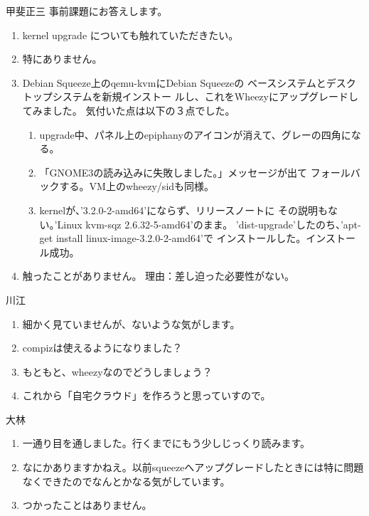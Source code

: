 \documentclass[mingoth,a4paper]{jsarticle}
\begin{document}
\clearpage

\begin{prework}{ 甲斐正三 }
  事前課題にお答えします。
  \begin{enumerate}
  \item %
    kernel upgrade についても触れていただきたい。
  \item %
    特にありません。
  \item %
    Debian Squeeze上のqemu-kvmにDebian Squeezeの
    ベースシステムとデスクトップシステムを新規インストー
    ルし、これをWheezyにアップグレードしてみました。
    気付いた点は以下の３点でした。
    \def\theenumii{\arabic{enumii}}
    \def\labelenumii{(\theenumii)~}
    \begin{enumerate}
    \item %
      upgrade中、パネル上のepiphanyのアイコンが消えて、グレーの四角になる。
    \item %
      「GNOME3の読み込みに失敗しました。」メッセージが出て
      フォールバックする。VM上のwheezy/sidも同様。
    \item %
      kernelが、'3.2.0-2-amd64'にならず、リリースノートに
      その説明もない。'Linux kvm-sqz 2.6.32-5-amd64'のまま。
      'dist-upgrade'したのち、'apt-get install linux-image-3.2.0-2-amd64'で
      インストールした。インストール成功。
    \end{enumerate}
  \item %
    触ったことがありません。
    理由：差し迫った必要性がない。
  \end{enumerate}
\end{prework}

\begin{prework}{ 川江 }
  \begin{enumerate}
  \item %
   細かく見ていませんが、ないような気がします。
 \item %
   compizは使えるようになりました？
 \item %
   もともと、wheezyなのでどうしましょう？
 \item %
   これから「自宅クラウド」を作ろうと思っていすので。
 \end{enumerate}
\end{prework}

\begin{prework}{ 大林 }
  \begin{enumerate}
  \item %
   一通り目を通しました。行くまでにもう少しじっくり読みます。
   \setcounter{enumi}{2}
 \item %
   なにかありますかねえ。以前squeezeへアップグレードしたときには特に問題なくできたのでなんとかなる気がしています。
 \item %
   つかったことはありません。
 \end{enumerate}
\end{prework}
\end{document}
